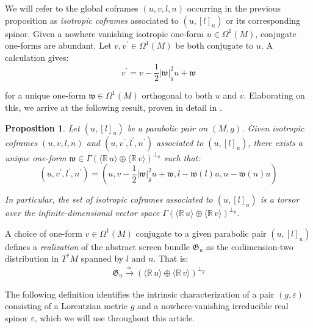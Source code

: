 \documentclass[10pt,reqno,a4paper]{amsart}
\theoremstyle{plain}
\newtheorem{prop}[thm]{Proposition}
\theoremstyle{definition}
\theoremstyle{remark}
\theoremstyle{remark}
\def\frw{\mathfrak{w}}
\renewcommand{\(}{ (}
\renewcommand{\)}{ )}
\begin{document}
\noindent
We will refer to the global coframes $(u,v,l,n)$ occurring in the previous proposition as \emph{isotropic coframes} associated to $(u,[l]_u)$ or its corresponding spinor. Given a nowhere vanishing isotropic one-form $u\in \Omega^1(M)$, conjugate one-forms are abundant. Let $v, v^{\prime} \in \Omega^1(M)$ be both conjugate to $u$. A calculation gives:
\begin{equation*}
v^{\prime} = v - \frac{1}{2} \vert \frw\vert_g^2 u + \frw
\end{equation*} 

\noindent
for a unique one-form $\frw\in\Omega^1(M)$ orthogonal to both $u$ and $v$. Elaborating on this, we arrive at the following result, proven in detail in \cite{ShahbaziTesis}.

\begin{prop}
\label{prop:primerparallelizationglobal}
Let $(u,[l]_u)$ be a parabolic pair on $(M,g)$. Given isotropic coframes $(u,v,l,n)$ and $(u,v^{\prime},l^{\prime},n^{\prime})$ associated to $(u,[l]_u)$, there exists a unique one-form $\frw\in \Gamma( \langle \mathbb{R}\, u\rangle  \oplus \langle \mathbb{R}\, v \rangle)^{\perp_h}$ such that:
\begin{equation}
\label{eq:equivalencerelation}
(u,v^{\prime},l^{\prime},n^{\prime}) = (u,v-\frac{1}{2} \vert\frw\vert_g^2 u + \frw,l - \frw(l) u,n - \frw(n) u)
\end{equation}
	
\noindent
In particular, the set of isotropic coframes associated to $(u,[l]_u)$ is a torsor over the infinite-dimensional vector space $\Gamma( \langle \mathbb{R}\, u\rangle  \oplus \langle \mathbb{R}\, v \rangle)^{\perp_g}$.
\end{prop}   

\noindent
A choice of one-form $v\in\Omega^1(M)$ conjugate to a given parabolic pair $(u,[l]_u)$ defines a \emph{realization} of the abstract screen bundle $\mathfrak{G}_u$ as the codimension-two distribution in $T^{\ast}M$ spanned by $l$ and $n$. That is:
\begin{eqnarray*}
\mathfrak{G}_u \xrightarrow{\simeq} ( \langle \mathbb{R}\, u\rangle  \oplus \langle \mathbb{R}\, v \rangle)^{\perp_g} 
\end{eqnarray*}

\noindent
The following definition identifies the intrinsic characterization of a pair $(g,\varepsilon)$ consisting of a Lorentzian metric $g$ and a nowhere-vanishing irreducible real spinor $\varepsilon$, which we will use throughout this article.
\end{document}
